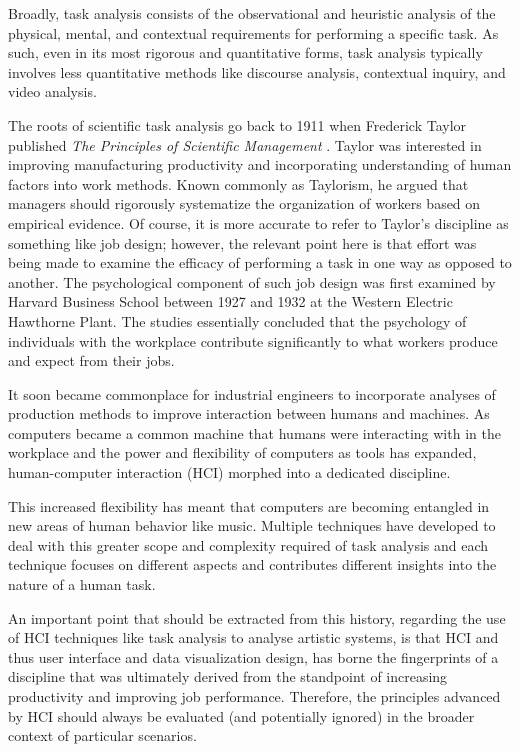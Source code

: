 Broadly, task analysis consists of the observational and heuristic analysis of the physical, mental, and contextual requirements for performing a specific task. As such, even in its most rigorous and quantitative forms, task analysis typically involves less quantitative methods like discourse analysis, contextual inquiry, and video analysis. 

The roots of scientific task analysis go back to 1911 when Frederick Taylor published \emph{The Principles of Scientific Management} \cite{crystal2004}. Taylor was interested in improving manufacturing productivity and incorporating understanding of human factors into work methods. Known commonly as Taylorism, he argued that managers should rigorously systematize the organization of workers based on empirical evidence. Of course, it is more accurate to refer to Taylor's discipline as something like job design; however, the relevant point here is that effort was being made to examine the efficacy of performing a task in one way as opposed to another. The psychological component of such job design was first examined by Harvard Business School between 1927 and 1932 at the Western Electric Hawthorne Plant. The studies essentially concluded that the psychology of individuals with the workplace contribute significantly to what workers produce and expect from their jobs.

It soon became commonplace for industrial engineers to incorporate analyses of production methods to improve interaction between humans and machines. As computers became a common machine that humans were interacting with in the workplace and the power and flexibility of computers as tools has expanded, human-computer interaction (HCI) morphed into a dedicated discipline. 

This increased flexibility has meant that computers are becoming entangled in new areas of human behavior like music. Multiple techniques have developed to deal with this greater scope and complexity required of task analysis and each technique focuses on different aspects and contributes different insights into the nature of a human task.

An important point that should be extracted from this history, regarding the use of HCI techniques like task analysis to analyse artistic systems, is that HCI and thus user interface and data visualization design, has borne the fingerprints of a discipline that was ultimately derived from the standpoint of increasing productivity and improving job performance. Therefore, the principles advanced by HCI should always be evaluated (and potentially ignored) in the broader context of particular scenarios. 

